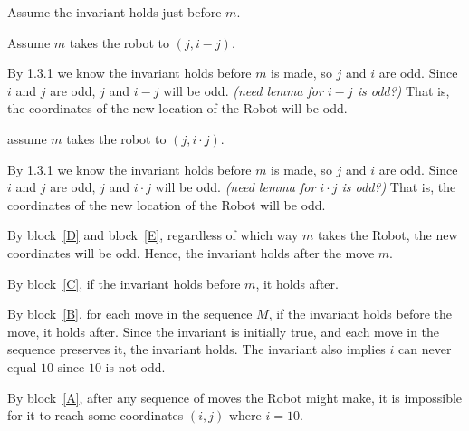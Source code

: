 \documentclass[11pt]{article}
\begin{document}
\begin{longFormProof}
\begin{block}[A]
\begin{block}[B]
      \begin{block}[C]
        {Assume the invariant holds just before $m$.}

        \begin{block}[D]
          {Assume $m$ takes the robot to $(j, i - j)$.}

          \step By 1.3.1 we know the invariant holds before $m$ is made, so $j$ and $i$ are odd.
          \step Since $i$ and $j$ are odd, $j$ and $i-j$ will be odd. \hfill \textit{(need lemma for $i-j$ is odd?)}
          \step That is, the coordinates of the new location of the Robot will be odd.

        \end{block}

        \begin{block}[E]
          {assume $m$ takes the robot to $(j, i\cdot j)$.}

          \step By 1.3.1 we know the invariant holds before $m$ is made, so $j$ and $i$ are odd.
          \step Since $i$ and $j$ are odd, $j$ and $i\cdot j$ will be odd. \hfill \textit{(need lemma for $i\cdot j$ is odd?)}
          \step That is, the coordinates of the new location of the Robot will be odd.

        \end{block}

        \step By block~\ref{D} and block~\ref{E}, regardless of which way $m$ takes the Robot, the new coordinates will be odd.
        \step Hence, the invariant holds after the move $m$.

      \end{block}

      \step By block~\ref{C}, if the invariant holds before $m$, it holds after.

    \end{block}

    \step By block~\ref{B}, for each move in the sequence $M$, if the invariant holds before the move, it holds after.
    \step Since the invariant is initially true, and each move in the sequence preserves it, the invariant holds.
    \step The invariant also implies $i$ can never equal $10$ since $10$ is not odd.

  \end{block}
  \step By block~\ref{A}, after any sequence of moves the Robot might make, it is impossible for it to reach some coordinates $(i,j)$ where $i=10$.

\end{longFormProof}
\end{document}
